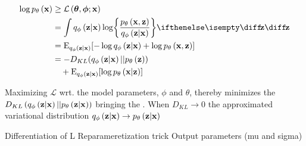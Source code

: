 \begin{gather}
	\begin{split}
		\log \dec{\vec{x}} & \ge \mathcal{L}\left(\vec{\theta},\vec{\phi};\vec{x}\right)
		\\ & =
		\int \enc{\vec{z}|\vec{x}} \log \curlies*{ \frac{\dec{\vec{x},\vec{z}}}{\enc{\vec{z}|\vec{x}} } } \D{\vec{z}} \\ 
		& = \E_{\enc{\vec{z}|\vec{x}}} \brackets{- \log \enc{\vec{z}|\vec{x}} + \log \dec{\vec{x},\vec{z}} } 
		\\
		& = -D_{KL}\parens{ \enc{\vec{z}|\vec{x}}||\dec{\vec{z}} } 
		\\ 
		& \quad+ \E_{\enc{\vec{z}|\vec{x}}} \brackets{\log \dec{\vec{x}|\vec{z}} }   	
	\end{split} 
\end{gather}

Maximizing $\mathcal{L}$ wrt. the model parameters, $\phi$ and $\theta$, thereby minimizes the $D_{KL}\left( q_{\phi}\left(\bm{\mathrm{z}}|\bm{\mathrm{x}}\right)||p_{\theta}\left(\bm{\mathrm{z}}|\bm{\mathrm{x}}\right)\right)$ bringing the . When $D_{KL}\rightarrow 0$ the approximated variational distribution $q_{\phi}\left(\bm{\mathrm{z}}|\bm{\mathrm{x}}\right)\rightarrow p_{\theta}\left(\bm{\mathrm{z}}|\bm{\mathrm{x}}\right)$

Differentiation of L
Reparameretization trick
Output parameters (mu and sigma)


